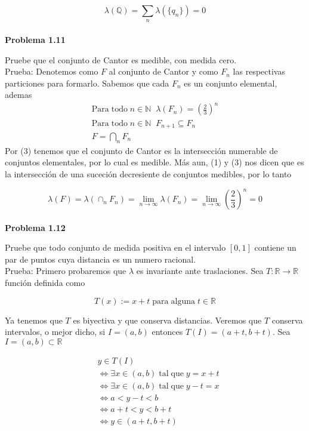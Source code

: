\documentclass[12pt]{article}
\begin{document}
    \[\lambda (\mathbb{Q}) = \sum_n \lambda (\{q_n\}) = 0\]
    \\

    \textbf{Problema 1.11}

    Pruebe que el conjunto de Cantor es medible, con medida cero.
    \\

    Prueba: Denotemos como $F$ al conjunto de Cantor y como $F_n$ las respectivas particiones 
    para formarlo. Sabemos que cada $F_n$ es un conjunto elemental, ademas 
    \begin{gather}
        \mathrm{Para \; todo}\; n\in \mathbb{N} \;\; \lambda (F_n) = \left(\frac{2}{3}\right)^n \\
        \mathrm{Para \; todo}\; n\in \mathbb{N} \;\; F_{n+1} \subseteq F_{n} \\
        F = \bigcap_n F_n
    \end{gather}
    Por (3) tenemos que el conjunto de Cantor es la intersecci\'on numerable de conjuntos 
    elementales, por lo cual es medible. M\'as aun, (1) y (3) nos dicen que es la 
    intersecci\'on de una suceci\'on decresiente de conjuntos medibles, por lo tanto 

    \[\lambda (F) = \lambda (\cap_n F_n) = \lim_{n\rightarrow \infty} \lambda (F_n) = \lim_{n\rightarrow \infty} \left(\frac{2}{3}\right)^n = 0\]
    \\

    \textbf{Problema 1.12}

    Pruebe que todo conjunto de medida positiva en el intervalo $[0,1]$ contiene un par de 
    puntos cuya distancia es un numero racional. 
    \\

    Prueba: Primero probaremos que $\lambda$ es invariante ante traslaciones. Sea 
    $T:\mathbb{R} \rightarrow \mathbb{R}$ funci\'on definida como 

    \[T(x) := x+t \; \mathrm{para \; alguna}\; t\in \mathbb{R}\]
    
    \noindent Ya tenemos que $T$ es biyectiva y que conserva distancias. Veremos que $T$
    conserva intervalos, o mejor dicho, si $I = (a,b)$ entonces $T(I) = (a+t,b+t)$. Sea 
    $I = (a,b) \subset \mathbb{R}$

    \begin{equation}
        \begin{aligned}
        & y\in T(I) \\
        & \Leftrightarrow \exists x\in (a,b)\; \mathrm{tal\;que}\; y = x+t \\
        & \Leftrightarrow \exists x\in (a,b)\; \mathrm{tal\;que}\; y-t = x \\
        & \Leftrightarrow a < y-t < b \\
        & \Leftrightarrow a+t < y < b+t \\
        & \Leftrightarrow y\in (a+t,b+t)
        \end{aligned}
    \end{equation}
    
\end{document}
